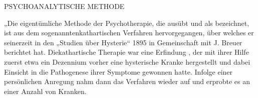 \documentclass[twoside=true,titlepage=false,open=any, parskip=never, fontsize=10pt, headings=small, chapterprefix=false, appendixprefix=false]{scrbook}
\begin{document}
            \pend
        
        \beforeeledchapter
    
            
            
            
        
               
                   PSYCHOANALYTISCHE METHODE
               
            
        \pend
        \beforeeledchapter
    
            
        \pstart
        „Die eigentümliche Methode der Psychotherapie, die  ausübt und als  bezeichnet, ist aus dem sogenanntenkathartischen Verfahren hervorgegangen,
               über welches er seinerzeit in den „Studien über Hysterie“ 1895 in
               Gemeinschaft mit
               J. Breuer berichtet
               hat. Diekathartische
                  Therapie war eine Erfindung , der mit ihrer Hilfe zuerst etwa ein Dezennium vorher
               eine hysterische Kranke hergestellt und dabei Einsicht in die Pathogenese ihrer Symptome gewonnen
               hatte. Infolge einer persönlichen Anregung  nahm dann  das Verfahren
               wieder auf und erprobte es an einer  Anzahl von Kranken.
        \pend
    
\end{document}
